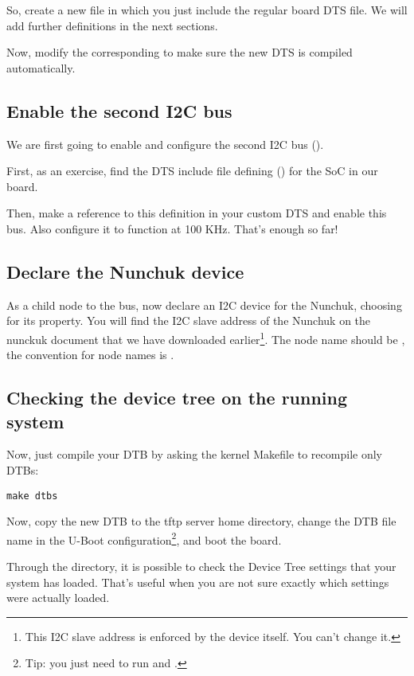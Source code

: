 So, create a new  file in which you
just include the regular board DTS file. We will add further definitions
in the next sections.

Now, modify the corresponding  to make sure the
new DTS is compiled automatically.

\subsection{Enable the second I2C bus}

We are first going to enable and configure the second I2C bus
().

First, as an exercise, find the DTS include file defining ()
for the SoC in our board.

Then, make a reference to this definition in your custom DTS and
enable this bus. Also configure it to function at 100 KHz. That's
enough so far!

\subsection{Declare the Nunchuk device}

As a child node to the  bus, now declare an I2C device
for the Nunchuk, choosing  for its 
property. You will find the I2C slave address of the Nunchuk on the
nunckuk document that we have downloaded earlier\footnote{This I2C slave
address is enforced by the device itself. You can't change it.}.
The node name should be , the convention for node
names is .

\subsection{Checking the device tree on the running system}

Now, just compile your DTB by asking the kernel Makefile to recompile
only DTBs:

\begin{verbatim}
make dtbs
\end{verbatim}

Now, copy the new DTB to the tftp server home directory, change the DTB
file name in the U-Boot configuration\footnote{Tip: you just need to run
 and .}, and boot the board.

Through the  directory, it is possible to check
the Device Tree settings that your system has loaded. That's useful when
you are not sure exactly which settings were actually loaded.

